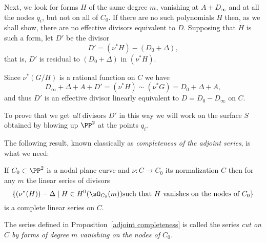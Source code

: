 
Next, we look for forms $H$ of the same degree $m$, vanishing at $A+D_\infty$ and at all the nodes $q_i$,  but not on all of $C_0$. If there are no such polynomials $H$ then, as we shall show,
there are no effective divisors equivalent to $D$. Supposing that $H$ is such a form, let $D'$ be the divisor 
$$
D' = (\nu^*H) -( D_0 + \Delta),
$$
that is, $D'$ is residual to $( D_0 + \Delta)$ in $(\nu^*H)$. 

Since $\nu^*(G/H)$ is a rational function on $C$ we have
$$
D_\infty +\Delta + A+ D' = (\nu^*H) \sim (\nu^*G) = D_0 + \Delta + A,
$$
and thus $D'$ is an effective divisor linearly equivalent to $D = D_{0}-D_{\infty}$ on $C$.

To prove that we get \emph{all} divisors $D'$ in this way we will work on the surface $S$ obtained by blowing up
$\PP^2$ at the points $q_i$. 

The following result, known classically as \emph{completeness of the adjoint series}, is what we need:

\begin{proposition}\label{adjoint completeness}
If $C_0 \subset \PP^2$ is a nodal plane curve and $\nu : C \to C_0$ its normalization $C$ then for any $m$ the linear series of divisors 
$$
\{
(\nu^{*}(H))-\Delta \mid H \in H^{0}(\sO_{C_{0}}(m))
\hbox{such that $H$ vanishes on the nodes of $C_{0}$}
\}
$$ 
is a complete linear series on $C.$
\end{proposition}

The series defined in Proposition~\ref{adjoint completeness} is called the series \emph{cut on $C$ by
forms of degree $m$ vanishing on the nodes of $C_{0}$.}

